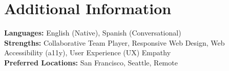 \section{Additional Information}
\textbf{Languages:} English (Native), Spanish (Conversational) \\
\textbf{Strengths:} Collaborative Team Player, Responsive Web Design, Web Accessibility (a11y), User Experience (UX) Empathy \\
\textbf{Preferred Locations:} San Francisco, Seattle, Remote
